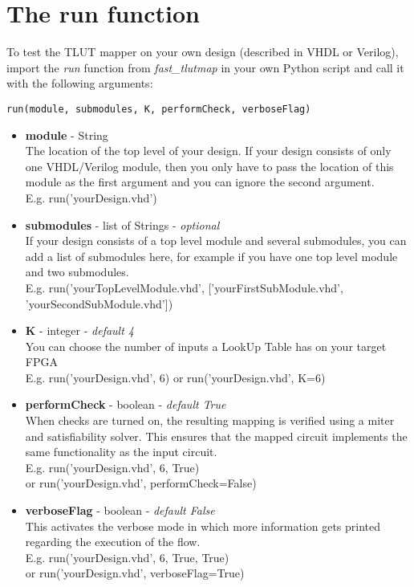 \documentclass[a4paper,oneside]{memoir}
\begin{document}
\section{The run function}\label{sec:run_function}
To test the TLUT mapper on your own design (described in VHDL or Verilog), import the \emph{run} function from \emph{fast\_tlutmap} in your own Python script and call it with the following arguments:
\begin{lstlisting}
run(module, submodules, K, performCheck, verboseFlag)
\end{lstlisting}
\begin{itemize}
\item \textbf{module} - String\\
The location of the top level of your design. If your design consists of only one VHDL/Verilog module, then you only have to pass the location of this module as the first argument and you can ignore the second argument.\\

E.g. run('yourDesign.vhd')

\item \textbf{submodules} - list of Strings - \textit{optional}\\
If your design consists of a top level module and several submodules, you can add a list of submodules here, for example if you have one top level module and two submodules.\\

E.g. run('yourTopLevelModule.vhd', ['yourFirstSubModule.vhd', 'yourSecondSubModule.vhd'])

\item \textbf{K} - integer - \textit{default 4}\\
You can choose the number of inputs a LookUp Table has on your target FPGA\\

E.g. run('yourDesign.vhd', 6)
or run('yourDesign.vhd', K=6)

\item \textbf{performCheck} - boolean - \textit{default True}\\
When checks are turned on, the resulting mapping is verified using a miter and satisfiability solver. This ensures that the mapped circuit implements the same functionality as the input circuit.\\

E.g. run('yourDesign.vhd', 6, True)\\
or run('yourDesign.vhd', performCheck=False)

\item \textbf{verboseFlag} - boolean - \textit{default False}\\
This activates the verbose mode in which more information gets printed regarding the execution of the flow.\\

E.g. run('yourDesign.vhd', 6, True, True)\\ or run('yourDesign.vhd', verboseFlag=True)
\end{itemize}
\end{document}

